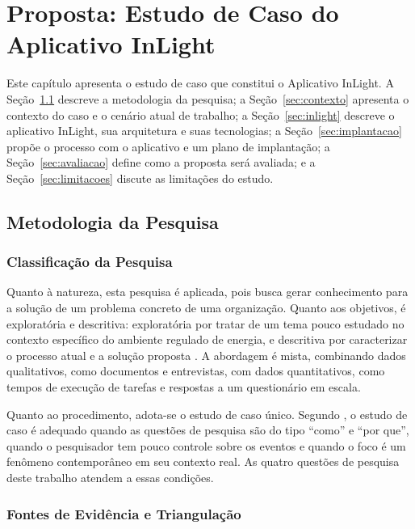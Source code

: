 \chapter{Proposta: Estudo de Caso do Aplicativo InLight}
\label{sec:proposta}

Este capítulo apresenta o estudo de caso que constitui o Aplicativo InLight. A Seção~\ref{sec:metodologia} descreve a metodologia da pesquisa; a Seção~\ref{sec:contexto} apresenta o contexto do caso e o cenário atual de trabalho; a Seção~\ref{sec:inlight} descreve o aplicativo InLight, sua arquitetura e suas tecnologias; a Seção~\ref{sec:implantacao} propõe o processo com o aplicativo e um plano de implantação; a Seção~\ref{sec:avaliacao} define como a proposta será avaliada; e a Seção~\ref{sec:limitacoes} discute as limitações do estudo.

\section{Metodologia da Pesquisa}
\label{sec:metodologia}

\subsection{Classificação da Pesquisa}

Quanto à natureza, esta pesquisa é aplicada, pois busca gerar conhecimento para a solução de um problema concreto de uma organização. Quanto aos objetivos, é exploratória e descritiva: exploratória por tratar de um tema pouco estudado no contexto específico do ambiente regulado de energia, e descritiva por caracterizar o processo atual e a solução proposta \citep{gil2019}. A abordagem é mista, combinando dados qualitativos, como documentos e entrevistas, com dados quantitativos, como tempos de execução de tarefas e respostas a um questionário em escala.

Quanto ao procedimento, adota-se o estudo de caso único. Segundo \citet{yin2015}, o estudo de caso é adequado quando as questões de pesquisa são do tipo ``como'' e ``por que'', quando o pesquisador tem pouco controle sobre os eventos e quando o foco é um fenômeno contemporâneo em seu contexto real. As quatro questões de pesquisa deste trabalho atendem a essas condições.

\subsection{Fontes de Evidência e Triangulação}


